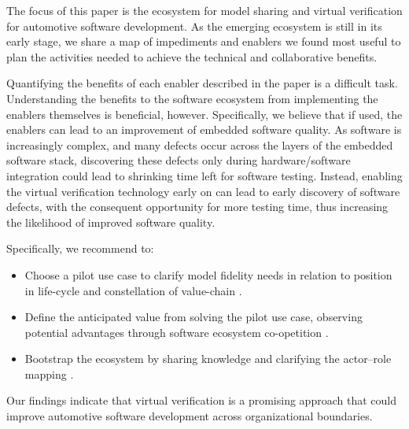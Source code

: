 The focus of this paper is the ecosystem for model sharing and virtual verification for automotive software development.
As the emerging ecosystem is still in its early stage, we share a map of impediments and enablers we found most useful to plan the activities needed to achieve the technical and collaborative benefits.

Quantifying the benefits of each enabler described in the paper is a difficult task.
Understanding the benefits to the software ecosystem from implementing the enablers themselves is beneficial, however. 
Specifically, we believe that if used, the enablers can lead to an improvement of embedded software quality.
As software is increasingly complex, and many defects occur across the layers of the embedded software stack, discovering these defects only during hardware/software integration could lead to shrinking time left for software testing.
Instead, enabling the virtual verification technology early on can lead to early discovery of software defects, with the consequent opportunity for more testing time, thus increasing the likelihood of improved software quality.

Specifically, we recommend to:
\begin{itemize}
    \item Choose a pilot use case to clarify model fidelity needs in relation to position in life-cycle and constellation of value-chain \cite{Boehm1981}.
    \item Define the anticipated value from solving the pilot use case, observing potential advantages through software ecosystem co-opetition \cite{Agerfalk2008}.
    \item Bootstrap the ecosystem by sharing knowledge and clarifying the actor--role mapping \cite{kilamo2012proprietary}.
\end{itemize}

Our findings indicate that virtual verification is a promising approach that could improve automotive software development across organizational boundaries.





